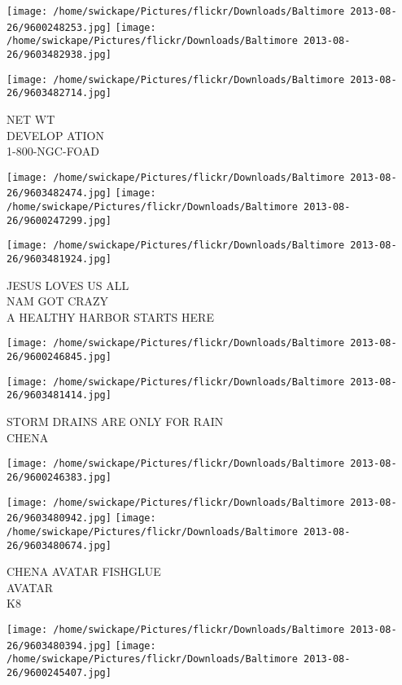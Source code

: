 \documentclass[10pt,letterpaper]{article}
\begin{document}
\texttt{[image: /home/swickape/Pictures/flickr/Downloads/Baltimore 2013-08-26/9600248253.jpg]}
\texttt{[image: /home/swickape/Pictures/flickr/Downloads/Baltimore 2013-08-26/9603482938.jpg]}

\vspace{0.25in}
\texttt{[image: /home/swickape/Pictures/flickr/Downloads/Baltimore 2013-08-26/9603482714.jpg]}

NET WT\\
DEVELOP ATION\\
1{-}800{-}NGC{-}FOAD\\
\pagebreak

\texttt{[image: /home/swickape/Pictures/flickr/Downloads/Baltimore 2013-08-26/9603482474.jpg]}
\texttt{[image: /home/swickape/Pictures/flickr/Downloads/Baltimore 2013-08-26/9600247299.jpg]}

\texttt{[image: /home/swickape/Pictures/flickr/Downloads/Baltimore 2013-08-26/9603481924.jpg]}

JESUS LOVES US ALL\\
NAM GOT CRAZY\\
A HEALTHY HARBOR STARTS HERE\\
\pagebreak

\texttt{[image: /home/swickape/Pictures/flickr/Downloads/Baltimore 2013-08-26/9600246845.jpg]}

\vspace{0.25in}
\texttt{[image: /home/swickape/Pictures/flickr/Downloads/Baltimore 2013-08-26/9603481414.jpg]}

STORM DRAINS ARE ONLY FOR RAIN\\
CHENA\\
\pagebreak

\texttt{[image: /home/swickape/Pictures/flickr/Downloads/Baltimore 2013-08-26/9600246383.jpg]}

\vspace{0.25in}
\texttt{[image: /home/swickape/Pictures/flickr/Downloads/Baltimore 2013-08-26/9603480942.jpg]}
\texttt{[image: /home/swickape/Pictures/flickr/Downloads/Baltimore 2013-08-26/9603480674.jpg]}

CHENA AVATAR FISHGLUE\\
AVATAR\\
K8\\
\pagebreak

\texttt{[image: /home/swickape/Pictures/flickr/Downloads/Baltimore 2013-08-26/9603480394.jpg]}
\texttt{[image: /home/swickape/Pictures/flickr/Downloads/Baltimore 2013-08-26/9600245407.jpg]}
\end{document}
